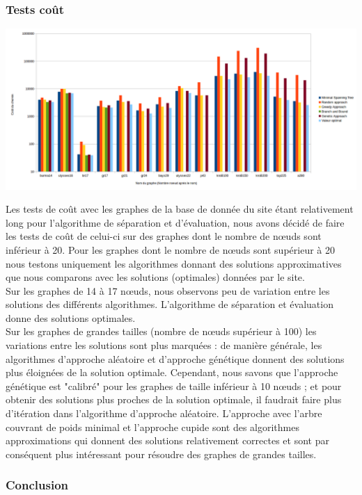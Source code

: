 \documentclass[10pt,a4paper]{report}
\begin{document}
	\subsubsection{Tests coût}
			\includegraphics[scale=0.45]{./Ressource/cout_graphes_site.png}
			\begin{flushleft}
			Les tests de coût avec les graphes de la base de donnée du site étant relativement long pour l'algorithme de séparation et d'évaluation, nous avons décidé de faire les tests de coût de celui-ci sur des graphes dont le nombre de nœuds sont inférieur à 20. Pour les graphes dont le nombre de nœuds sont supérieur à 20 nous testons uniquement les algorithmes donnant des solutions approximatives que nous comparons avec les solutions (optimales) données par le site.\\
			Sur les graphes de 14 à 17 nœuds, nous observons peu de variation entre les solutions des différents algorithmes. L'algorithme de séparation et évaluation donne des solutions optimales.\\
			Sur les graphes de grandes tailles (nombre de nœuds supérieur à 100) les variations entre les solutions sont plus marquées  : de manière générale, les algorithmes d'approche aléatoire et d'approche génétique donnent des solutions plus éloignées de la solution optimale. Cependant, nous savons que  l'approche génétique est "calibré" pour les graphes de taille inférieur à 10 nœuds ;  et pour obtenir des solutions plus proches de la solution optimale, il faudrait faire plus d'itération dans l'algorithme d'approche aléatoire.
			L'approche avec l'arbre couvrant de poids minimal et l'approche cupide sont des algorithmes approximations qui donnent des solutions relativement correctes et sont par conséquent plus intéressant pour résoudre des graphes de grandes tailles.
			\end{flushleft}
	\subsubsection{Conclusion}
\end{document}
